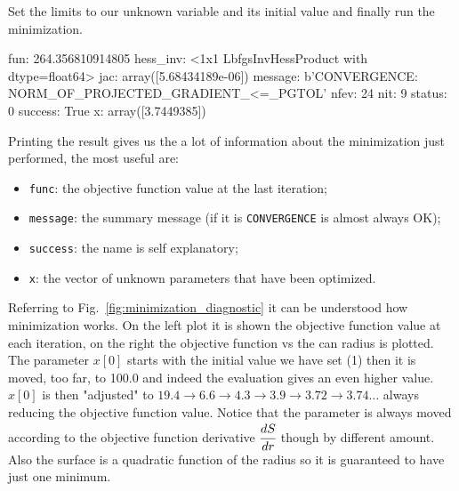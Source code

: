 
Set the limits to our unknown variable and its initial value and finally run the minimization.

\begin{ioutput}
      fun: 264.356810914805
 hess_inv: <1x1 LbfgsInvHessProduct with dtype=float64>
      jac: array([5.68434189e-06])
  message: b'CONVERGENCE: NORM_OF_PROJECTED_GRADIENT_<=_PGTOL'
     nfev: 24
      nit: 9
   status: 0
  success: True
        x: array([3.7449385])
\end{ioutput}

Printing the result gives us the a lot of information about the minimization just performed, the most useful are:
\begin{itemize}
\item \texttt{func}: the objective function value at the last iteration;
\item \texttt{message}: the summary message (if it is \texttt{CONVERGENCE} is almost always OK);
\item \texttt{success}: the name is self explanatory;
\item \texttt{x}: the vector of unknown parameters that have been optimized.
\end{itemize}

Referring to Fig.~\ref{fig:minimization_diagnostic} it can be understood how minimization works. On the left plot it is shown the objective function value at 
each iteration, on the right the objective function vs the can radius is plotted.
The parameter $x[0]$ starts with the initial value we have set (1) then it is moved, too far, to 100.0 and indeed the evaluation gives an even higher value. 
$x[0]$ is then "adjusted" to $19.4\rightarrow 6.6\rightarrow 4.3\rightarrow 3.9\rightarrow 3.72\rightarrow 3.74\ldots$ always reducing the objective 
function value. Notice that the parameter is always moved according to the objective function derivative $\cfrac{dS}{dr}$ though by different amount.
Also the surface is a quadratic function of the radius so it is guaranteed to have just one minimum.

